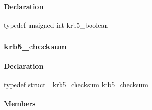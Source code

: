 \documentclass[letterpaper,10pt,english]{sphinxmanual}
\begin{document}
\begin{fulllineitems}
\label{appdev/refs/types/krb5_boolean:c.krb5_boolean}
\end{fulllineitems}



\paragraph{Declaration}
\label{appdev/refs/types/krb5_boolean:declaration}
typedef unsigned int krb5\_boolean


\subsubsection{krb5\_checksum}
\label{appdev/refs/types/krb5_checksum::doc}\label{appdev/refs/types/krb5_checksum:krb5-checksum}\label{appdev/refs/types/krb5_checksum:krb5-checksum-struct}

\begin{fulllineitems}
\label{appdev/refs/types/krb5_checksum:c.krb5_checksum}
\end{fulllineitems}



\paragraph{Declaration}
\label{appdev/refs/types/krb5_checksum:declaration}
typedef struct \_krb5\_checksum  krb5\_checksum


\paragraph{Members}
\label{appdev/refs/types/krb5_checksum:members}

\begin{fulllineitems}
\label{appdev/refs/types/krb5_checksum:c.krb5_checksum.magic}
\end{fulllineitems}


\begin{fulllineitems}
\label{appdev/refs/types/krb5_checksum:c.krb5_checksum.checksum_type}
\end{fulllineitems}
\end{document}
